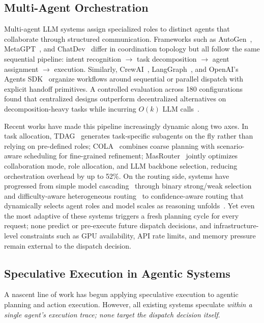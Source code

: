 \documentclass[conference,10pt]{IEEEtran}
\begin{document}
\subsection{Multi-Agent Orchestration}

Multi-agent LLM systems assign specialized roles to distinct agents that collaborate through structured communication.
Frameworks such as AutoGen~\cite{wu2023autogen}, MetaGPT~\cite{hong2024metagpt}, and ChatDev~\cite{qian2024chatdev} differ in coordination topology but all follow the same sequential pipeline: intent recognition $\rightarrow$ task decomposition $\rightarrow$ agent assignment $\rightarrow$ execution.
Similarly, CrewAI~\cite{crewai2024}, LangGraph~\cite{langgraph2024}, and OpenAI's Agents SDK~\cite{openai2025agentssdk} organize workflows around sequential or parallel dispatch with explicit handoff primitives.
A controlled evaluation across 180 configurations found that centralized designs outperform decentralized alternatives on decomposition-heavy tasks while incurring $O(k)$ LLM calls~\cite{qian2025scaling}.

Recent works have made this pipeline increasingly dynamic along two axes.
In task allocation, TDAG~\cite{qiao2024tdag} generates task-specific subagents on the fly rather than relying on pre-defined roles;
COLA~\cite{zhang2025cola} combines coarse planning with scenario-aware scheduling for fine-grained refinement;
MasRouter~\cite{li2025masrouter} jointly optimizes collaboration mode, role allocation, and LLM backbone selection, reducing orchestration overhead by up to 52\%.
On the routing side, systems have progressed from simple model cascading~\cite{chen2023frugalgpt} through binary strong/weak selection~\cite{ong2024routellm} and difficulty-aware heterogeneous routing~\cite{huang2024diffrouting} to confidence-aware routing that dynamically selects agent roles and model scales as reasoning unfolds~\cite{wang2026oimas}. 
Yet even the most adaptive of these systems triggers a fresh planning cycle for every request; none predict or pre-execute future dispatch decisions, and infrastructure-level constraints such as GPU availability, API rate limits, and memory pressure remain external to the dispatch decision.

\subsection{Speculative Execution in Agentic Systems} \label{sec:spec-agents}

A nascent line of work has begun applying speculative execution to agentic planning and action execution.
However, all existing systems speculate \emph{within a single agent's execution trace; none target the dispatch decision itself}.
\end{document}
